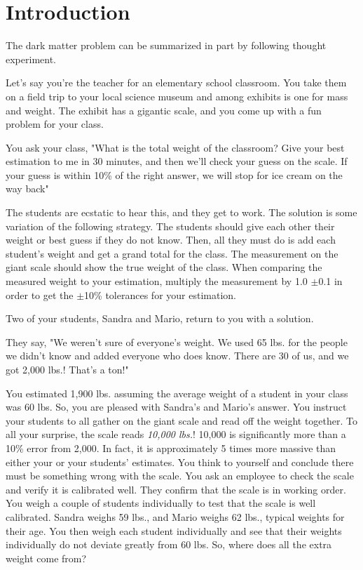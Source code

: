 \section{Introduction\label{sec:intro2dm}}

The dark matter problem can be summarized in part by following thought experiment.

Let's say you're the teacher for an elementary school classroom.
You take them on a field trip to your local science museum and among exhibits is one for mass and weight.
The exhibit has a gigantic scale, and you come up with a fun problem for your class.

You ask your class, "What is the total weight of the classroom?
Give your best estimation to me in 30 minutes, and then we'll check your guess on the scale.
If your guess is within 10\% of the right answer, we will stop for ice cream on the way back"

The students are ecstatic to hear this, and they get to work.
The solution is some variation of the following strategy.
The students should give each other their weight or best guess if they do not know.
Then, all they must do is add each student's weight and get a grand total for the class.
The measurement on the giant scale should show the true weight of the class.
When comparing the measured weight to your estimation, multiply the measurement by 1.0 $\pm$0.1 in order to get the $\pm$10\% tolerances for your estimation.

Two of your students, Sandra and Mario, return to you with a solution.

They say, "We weren't sure of everyone's weight.
We used 65 lbs. for the people we didn't know and added everyone who does know.
There are 30 of us, and we got 2,000 lbs.!
That's a ton!"

You estimated 1,900 lbs. assuming the average weight of a student in your class was 60 lbs.
So, you are pleased with Sandra's and Mario's answer.
You instruct your students to all gather on the giant scale and read off the weight together.
To all your surprise, the scale reads \textit{10,000 lbs.}!
10,000 is significantly more than a 10\% error from 2,000.
In fact, it is approximately 5 times more massive than either your or your students' estimates.
You think to yourself and conclude there must be something wrong with the scale.
You ask an employee to check the scale and verify it is calibrated well.
They confirm that the scale is in working order.
You weigh a couple of students individually to test that the scale is well calibrated.
Sandra weighs 59 lbs., and Mario weighs 62 lbs., typical weights for their age.
You then weigh each student individually and see that their weights individually do not deviate greatly from 60 lbs.
So, where does all the extra weight come from?


